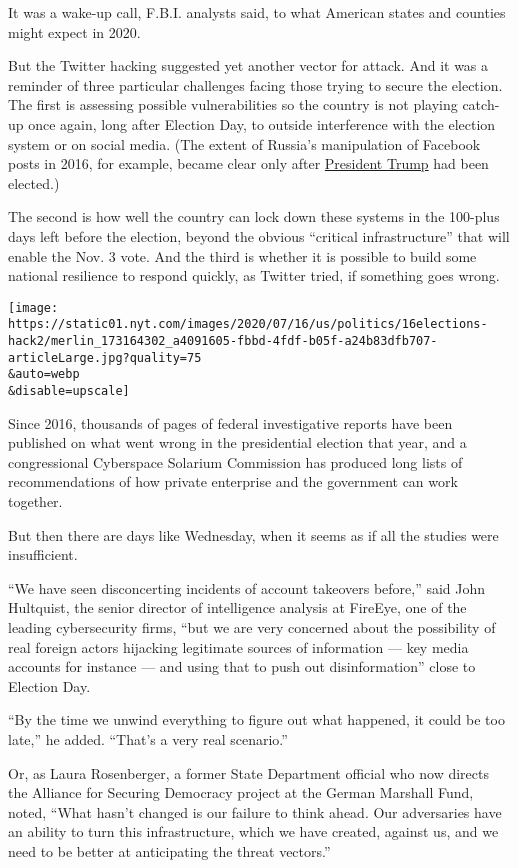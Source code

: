 It was a wake-up call, F.B.I. analysts said, to what American states and
counties might expect in 2020.

But the Twitter hacking suggested yet another vector for attack. And it
was a reminder of three particular challenges facing those trying to
secure the election. The first is assessing possible vulnerabilities so
the country is not playing catch-up once again, long after Election Day,
to outside interference with the election system or on social media.
(The extent of Russia's manipulation of Facebook posts in 2016, for
example, became clear only after
\href{https://www.nytimes.com/interactive/2020/us/elections/donald-trump.html}{President
Trump} had been elected.)

The second is how well the country can lock down these systems in the
100-plus days left before the election, beyond the obvious ``critical
infrastructure'' that will enable the Nov. 3 vote. And the third is
whether it is possible to build some national resilience to respond
quickly, as Twitter tried, if something goes wrong.

\texttt{[image: https://static01.nyt.com/images/2020/07/16/us/politics/16elections-hack2/merlin\_173164302\_a4091605-fbbd-4fdf-b05f-a24b83dfb707-articleLarge.jpg?quality=75\\\&auto=webp\\\&disable=upscale]}

Since 2016, thousands of pages of federal investigative reports have
been published on what went wrong in the presidential election that
year, and a congressional Cyberspace Solarium Commission has produced
long lists of recommendations of how private enterprise and the
government can work together.

But then there are days like Wednesday, when it seems as if all the
studies were insufficient.

``We have seen disconcerting incidents of account takeovers before,''
said John Hultquist, the senior director of intelligence analysis at
FireEye, one of the leading cybersecurity firms, ``but we are very
concerned about the possibility of real foreign actors hijacking
legitimate sources of information --- key media accounts for instance
--- and using that to push out disinformation'' close to Election Day.

``By the time we unwind everything to figure out what happened, it could
be too late,'' he added. ``That's a very real scenario.''

Or, as Laura Rosenberger, a former State Department official who now
directs the Alliance for Securing Democracy project at the German
Marshall Fund, noted, ``What hasn't changed is our failure to think
ahead. Our adversaries have an ability to turn this infrastructure,
which we have created, against us, and we need to be better at
anticipating the threat vectors.''

